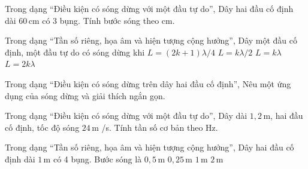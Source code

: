 \begin{ex}
Trong dạng “Điều kiện có sóng dừng với một đầu tự do”, Dây hai đầu cố định dài $60\,\text{cm}$ có 3 bụng. Tính bước sóng theo cm.
\end{ex}

\begin{ex}
Trong dạng “Tần số riêng, họa âm và hiện tượng cộng hưởng”, Dây một đầu cố định, một đầu tự do có sóng dừng khi
\choice
{\True $L=(2k+1)\lambda/4$}
{$L=k\lambda/2$}
{$L=k\lambda$}
{$L=2k\lambda$}
\end{ex}

\begin{ex}
Trong dạng “Điều kiện có sóng dừng trên dây hai đầu cố định”, Nêu một ứng dụng của sóng dừng và giải thích ngắn gọn.
\choiceTF

\end{ex}

\begin{ex}
Trong dạng “Điều kiện có sóng dừng với một đầu tự do”, Dây dài $1,2\,\text{m}$, hai đầu cố định, tốc độ sóng $24\,\text{m}$ /s. Tính tần số cơ bản theo Hz.
\end{ex}

\begin{ex}
Trong dạng “Tần số riêng, họa âm và hiện tượng cộng hưởng”, Dây hai đầu cố định dài $1\,\text{m}$ có 4 bụng. Bước sóng là
\choice
{\True $0,5\,\text{m}$}
{$0,25\,\text{m}$}
{$1\,\text{m}$}
{$2\,\text{m}$}
\end{ex}

